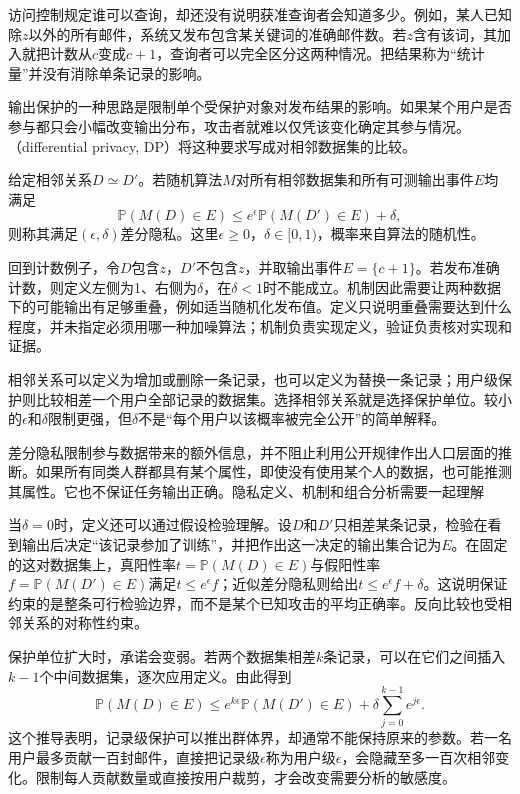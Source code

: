 访问控制规定谁可以查询，却还没有说明获准查询者会知道多少。例如，某人已知除$z$以外的所有邮件，系统又发布包含某关键词的准确邮件数。若$z$含有该词，其加入就把计数从$c$变成$c+1$，查询者可以完全区分这两种情况。把结果称为“统计量”并没有消除单条记录的影响。

输出保护的一种思路是限制单个受保护对象对发布结果的影响。如果某个用户是否参与都只会小幅改变输出分布，攻击者就难以仅凭该变化确定其参与情况。（differential privacy, DP）将这种要求写成对相邻数据集的比较。

\begin{definition}[差分隐私]
\label{def:privacy-dp}
给定相邻关系$D\simeq D'$。若随机算法$M$对所有相邻数据集和所有可测输出事件$E$均满足
\begin{equation}
 \mathbb P(M(D)\in E)
 \leq e^\epsilon\mathbb P(M(D')\in E)+\delta,
 \label{eq:privacy-definition}
\end{equation}
则称其满足$(\epsilon,\delta)$差分隐私。这里$\epsilon\geq0$，$\delta\in[0,1)$，概率来自算法的随机性。
\end{definition}

回到计数例子，令$D$包含$z$，$D'$不包含$z$，并取输出事件$E=\{c+1\}$。若发布准确计数，则定义左侧为1、右侧为$\delta$，在$\delta<1$时不能成立。机制因此需要让两种数据下的可能输出有足够重叠，例如适当随机化发布值。定义只说明重叠需要达到什么程度，并未指定必须用哪一种加噪算法；机制负责实现定义，验证负责核对实现和证据。

相邻关系可以定义为增加或删除一条记录，也可以定义为替换一条记录；用户级保护则比较相差一个用户全部记录的数据集。选择相邻关系就是选择保护单位。较小的$\epsilon$和$\delta$限制更强，但$\delta$不是“每个用户以该概率被完全公开”的简单解释。

差分隐私限制参与数据带来的额外信息，并不阻止利用公开规律作出人口层面的推断。如果所有同类人群都具有某个属性，即使没有使用某个人的数据，也可能推测其属性。它也不保证任务输出正确。隐私定义、机制和组合分析需要一起理解

当$\delta=0$时，定义还可以通过假设检验理解。设$D$和$D'$只相差某条记录，检验在看到输出后决定“该记录参加了训练”，并把作出这一决定的输出集合记为$E$。在固定的这对数据集上，真阳性率$t=\mathbb P(M(D)\in E)$与假阳性率$f=\mathbb P(M(D')\in E)$满足$t\leq e^\epsilon f$；近似差分隐私则给出$t\leq e^\epsilon f+\delta$。这说明保证约束的是整条可行检验边界，而不是某个已知攻击的平均正确率。反向比较也受相邻关系的对称性约束。

保护单位扩大时，承诺会变弱。若两个数据集相差$k$条记录，可以在它们之间插入$k-1$个中间数据集，逐次应用定义。由此得到
\begin{equation}
 \mathbb P(M(D)\in E)
 \leq e^{k\epsilon}\mathbb P(M(D')\in E)
   +\delta\sum_{j=0}^{k-1}e^{j\epsilon}.
 \label{eq:privacy-group-bound}
\end{equation}
这个推导表明，记录级保护可以推出群体界，却通常不能保持原来的参数。若一名用户最多贡献一百封邮件，直接把记录级$\epsilon$称为用户级$\epsilon$，会隐藏至多一百次相邻变化。限制每人贡献数量或直接按用户裁剪，才会改变需要分析的敏感度。

